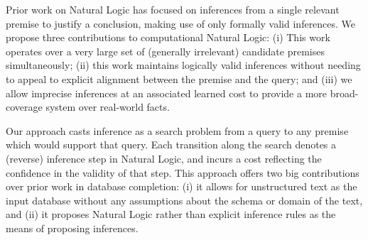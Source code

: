 Prior work on Natural Logic has focused on inferences from a single
  relevant premise to justify a conclusion, making use of only
  formally valid inferences.
We propose three contributions to computational Natural Logic:
  (i) This work operates over a very large set of (generally irrelevant)
    candidate premises simultaneously;
  (ii) this work maintains logically valid inferences without needing
    to appeal to explicit alignment between the premise and the query;
  and (iii) we allow imprecise inferences at an associated learned cost
  to provide a more broad-coverage system over real-world facts.

Our approach casts inference as a search problem from a query to any
  premise which would support that query.
Each transition along the search denotes a (reverse) inference step 
  in Natural Logic, and incurs a cost reflecting the confidence
  in the validity of that step.
This approach offers two big contributions over prior work in
  database completion:
  (i) it allows for unstructured text as the input database without
    any assumptions about the schema or domain of the text,
  and (ii) it proposes Natural Logic rather than explicit
    inference rules as the means of proposing inferences.

%
%

